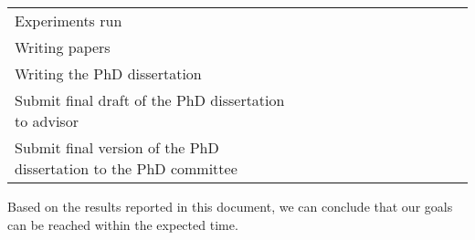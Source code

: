 \documentclass[authoryear,11pt]{elsarticle}
\begin{document}
\begin{table}[h!]
\begin{tabular}{|p{7cm}|c|c|c|c|c|c|c|c|c|c|c|c|}
		\cellcolor{blue}&&\cellcolor{blue}&\cellcolor{blue}&&&&\\
		\hline
		Experiments run &&&\cellcolor{blue}&\cellcolor{blue}&&\cellcolor{blue}&\cellcolor{blue}&&
		\cellcolor{blue}&&&\\
		\hline
		Writing papers &\cellcolor{blue}&&\cellcolor{blue}&&\cellcolor{blue}&\cellcolor{blue}&&&
		\cellcolor{blue}&&&\\
		\hline
		Writing the PhD dissertation &&&&\cellcolor{blue}&\cellcolor{blue}&\cellcolor{blue}&
		\cellcolor{blue}&\cellcolor{blue}&\cellcolor{blue}&&&\\
		\hline
		Submit final draft of the PhD dissertation to advisor &&&&&&&&&&\cellcolor[gray]{0.9}&&\\
		\hline
		Submit final version of the PhD dissertation to the PhD committee &&&&&&&&&&&\cellcolor[gray]{0.9}&\\
		\hline
		
 	\end{tabular}             
 \end{table}
 
   Based on the results reported in this document, we can conclude that our goals can be reached within the expected time.
	  	


	
\newpage
{}

\end{document}
